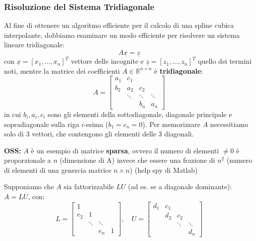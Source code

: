\vspace{0.6cm}
\subsubsection{Risoluzione del Sistema Tridiagonale}

Al fine di ottenere un algoritmo efficiente per il calcolo di una spline cubica interpolante, dobbiamo esaminare un modo efficiente per risolvere un sistema lineare tridiagonale:
\begin{equation} \label{eq:12}
A \underline{x} = \underline{z}
\end{equation}
con $\underline{x} = [x_1, \dots, x_n]^T$ vettore delle incognite e $\underline{z} = [z_1, \dots, z_n]^T$ quello dei termini noti, mentre la matrice dei coefficienti $A \in \mathbb{R}^{n \times n}$ è \textbf{tridiagonale}:
\begin{equation} \label{eq:13}
A = \begin{bmatrix}
a_1 & c_1 & & \\
b_2 & a_2 & c_2 & \\
& \ddots & \ddots & \ddots \\
& & b_n & a_n
\end{bmatrix}
\end{equation}
in cui $b_i, a_i, c_i$ sono gli elementi della sottodiagonale, diagonale principale e sopradiagonale sulla riga $i$-esima ($b_1 = c_n = 0$). Per memorizzare $A$ necessitiamo solo di 3 vettori, che contengono gli elementi delle 3 diagonali.

\vspace{0.4cm}
\textbf{OSS:} $A$ è un esempio di matrice \textbf{sparsa}, ovvero il numero di elementi $\neq 0$ è proporzionale a $n$ (dimensione di A) invece che essere una frazione di $n^2$ (numero di elementi di una genercia matrice $n \times n$) (help spy di Matlab)

\vspace{0.4cm}
Supponiamo che $A$ sia fattorizzabile $LU$ (ad es. se a diagonale dominante): $A = L U$, con:
\[
L = \begin{bmatrix}
1 & & & \\
e_2 & 1 & & \\
& \ddots & \ddots & \\
& & e_n & 1
\end{bmatrix}, \quad
U = \begin{bmatrix}
d_1 & c_1 & & \\
& d_2 & c_2 & \\
& & \ddots & \ddots \\
& & & d_n
\end{bmatrix}
\]

